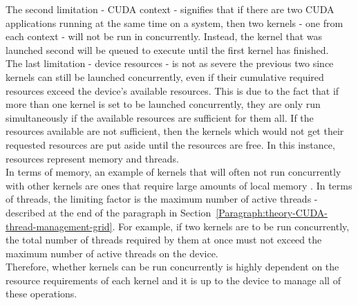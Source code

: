 The second limitation - CUDA context - signifies that if there are two CUDA applications running at the same time on a system, then two kernels - one from each context - will not be run in concurrently. Instead, the kernel that was launched second will be queued to execute until the first kernel has finished. \\
The last limitation - device resources - is not as severe the previous two since kernels can still be launched concurrently, even if their cumulative required resources exceed the device's available resources. This is due to the fact that if more than one kernel is set to be launched concurrently, they are only run simultaneously if the available resources are sufficient for them all. If the resources available are not sufficient, then the kernels which would not get their requested resources are put aside until the resources are free. In this instance, resources represent memory and threads. \\
In terms of memory, an example of kernels that will often not run concurrently with other kernels are ones that require large amounts of local memory \cite{NVIDIAMay2022}. In terms of threads, the limiting factor is the maximum number of active threads - described at the end of the \textit{} paragraph in Section~\ref{Paragraph:theory-CUDA-thread-management-grid}. For example, if two kernels are to be run concurrently, the total number of threads required by them at once must not exceed the maximum number of active threads on the device. \\
Therefore, whether kernels can be run concurrently is highly dependent on the resource requirements of each kernel and it is up to the device to manage all of these operations.

